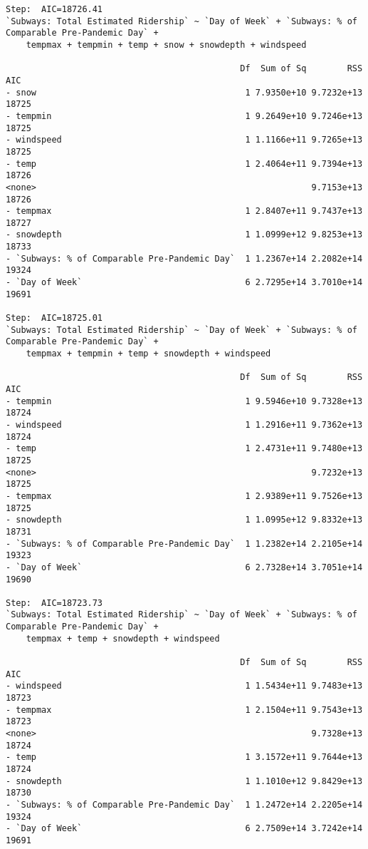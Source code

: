 \documentclass[
  letterpaper,
  DIV=11,
  numbers=noendperiod]{scrartcl}
\begin{document}
\begin{verbatim}
Step:  AIC=18726.41
`Subways: Total Estimated Ridership` ~ `Day of Week` + `Subways: % of Comparable Pre-Pandemic Day` + 
    tempmax + tempmin + temp + snow + snowdepth + windspeed

                                              Df  Sum of Sq        RSS   AIC
- snow                                         1 7.9350e+10 9.7232e+13 18725
- tempmin                                      1 9.2649e+10 9.7246e+13 18725
- windspeed                                    1 1.1166e+11 9.7265e+13 18725
- temp                                         1 2.4064e+11 9.7394e+13 18726
<none>                                                      9.7153e+13 18726
- tempmax                                      1 2.8407e+11 9.7437e+13 18727
- snowdepth                                    1 1.0999e+12 9.8253e+13 18733
- `Subways: % of Comparable Pre-Pandemic Day`  1 1.2367e+14 2.2082e+14 19324
- `Day of Week`                                6 2.7295e+14 3.7010e+14 19691

Step:  AIC=18725.01
`Subways: Total Estimated Ridership` ~ `Day of Week` + `Subways: % of Comparable Pre-Pandemic Day` + 
    tempmax + tempmin + temp + snowdepth + windspeed

                                              Df  Sum of Sq        RSS   AIC
- tempmin                                      1 9.5946e+10 9.7328e+13 18724
- windspeed                                    1 1.2916e+11 9.7362e+13 18724
- temp                                         1 2.4731e+11 9.7480e+13 18725
<none>                                                      9.7232e+13 18725
- tempmax                                      1 2.9389e+11 9.7526e+13 18725
- snowdepth                                    1 1.0995e+12 9.8332e+13 18731
- `Subways: % of Comparable Pre-Pandemic Day`  1 1.2382e+14 2.2105e+14 19323
- `Day of Week`                                6 2.7328e+14 3.7051e+14 19690

Step:  AIC=18723.73
`Subways: Total Estimated Ridership` ~ `Day of Week` + `Subways: % of Comparable Pre-Pandemic Day` + 
    tempmax + temp + snowdepth + windspeed

                                              Df  Sum of Sq        RSS   AIC
- windspeed                                    1 1.5434e+11 9.7483e+13 18723
- tempmax                                      1 2.1504e+11 9.7543e+13 18723
<none>                                                      9.7328e+13 18724
- temp                                         1 3.1572e+11 9.7644e+13 18724
- snowdepth                                    1 1.1010e+12 9.8429e+13 18730
- `Subways: % of Comparable Pre-Pandemic Day`  1 1.2472e+14 2.2205e+14 19324
- `Day of Week`                                6 2.7509e+14 3.7242e+14 19691


\end{verbatim}
\end{document}

